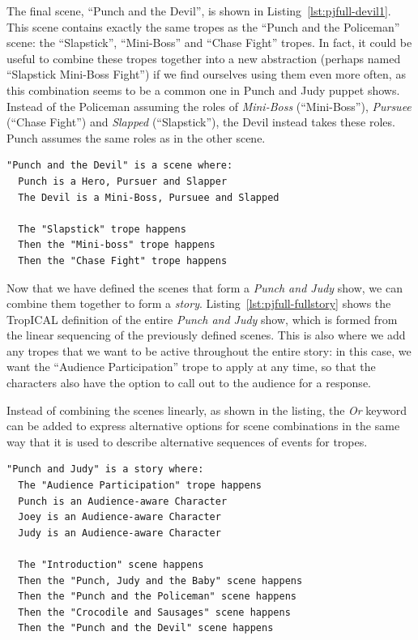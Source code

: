 \documentclass[11pt]{report}
\begin{document}
The final scene, ``Punch and the Devil'', is shown in
Listing~\ref{lst:pjfull-devil1}. This scene contains exactly the same tropes as
the ``Punch and the Policeman'' scene: the ``Slapstick'', ``Mini-Boss'' and ``Chase Fight''
tropes. In fact, it could be useful to combine these tropes together into a new
abstraction (perhaps named ``Slapstick Mini-Boss Fight'') if we find ourselves using them
even more often, as this combination seems to be a common one in Punch and Judy
puppet shows. Instead of the Policeman assuming the roles of \emph{Mini-Boss}
(``Mini-Boss''), \emph{Pursuee} (``Chase Fight'') and \emph{Slapped}
(``Slapstick''), the Devil instead takes these roles. Punch assumes the same
roles as in the other scene.


\begin{lstlisting}[showstringspaces=false,
label=lst:pjfull-devil1,caption={The ``Punch and the Devil'' scene in TropICAL}]
"Punch and the Devil" is a scene where:
  Punch is a Hero, Pursuer and Slapper
  The Devil is a Mini-Boss, Pursuee and Slapped

  The "Slapstick" trope happens
  Then the "Mini-boss" trope happens
  Then the "Chase Fight" trope happens
\end{lstlisting}

Now that we have defined the scenes that form a \emph{Punch and Judy} show, we
can combine them together to form a \emph{story}.
Listing~\ref{lst:pjfull-fullstory} shows the TropICAL definition of the entire
\emph{Punch and Judy} show, which is formed from the linear sequencing of the
previously defined scenes. This is also where we add any tropes that we want to
be active throughout the entire story: in this case, we want the ``Audience
Participation'' trope to apply at any time, so that the characters also have the
option to call out to the audience for a response.

Instead of combining the scenes linearly, as shown in the listing, the \emph{Or}
keyword can be added to express alternative options for scene combinations in
the same way that it is used to describe alternative sequences of events for tropes.

\begin{lstlisting}[showstringspaces=false,
label=lst:pjfull-fullstory,caption={The full ``Punch and Judy'' story in TropICAL}]
"Punch and Judy" is a story where:
  The "Audience Participation" trope happens
  Punch is an Audience-aware Character
  Joey is an Audience-aware Character
  Judy is an Audience-aware Character

  The "Introduction" scene happens
  Then the "Punch, Judy and the Baby" scene happens
  Then the "Punch and the Policeman" scene happens
  Then the "Crocodile and Sausages" scene happens
  Then the "Punch and the Devil" scene happens
\end{lstlisting}
\end{document}
